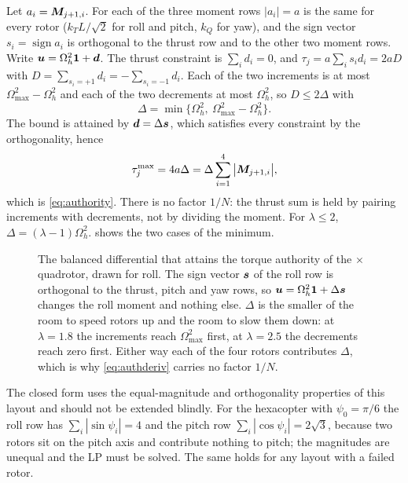 Let $a_i = \bm{M}_{j+1,i}$. For each of the three moment rows $|a_i|=a$ is the
same for every rotor ($k_TL/\sqrt2$ for roll and pitch, $k_Q$ for yaw), and the
sign vector $s_i=\operatorname{sign}a_i$ is orthogonal to the thrust row and to
the other two moment rows. Write $\bm{u} = \Omega_h^2\bm{1} + \bm{d}$. The
thrust constraint is $\sum_i d_i=0$, and $\tau_j = a\sum_i s_i d_i = 2aD$ with
$D=\sum_{s_i=+1}d_i=-\sum_{s_i=-1}d_i$. Each of the two increments is at most
$\Omega_{\max}^2-\Omega_h^2$ and each of the two decrements at most $\Omega_h^2$,
so $D\le2\Delta$ with
\begin{equation}
  \Delta = \min\{\Omega_h^2,\ \Omega_{\max}^2-\Omega_h^2\} .
\end{equation}
The bound is attained by $\bm{d}=\Delta\bm{s}$, which satisfies every
constraint by the orthogonality, hence
\begin{equation}
  \tau_j^{\max} = 4a\Delta = \Delta\sum_{i=1}^{4}\big|\bm{M}_{j+1,i}\big| ,
  \label{eq:authderiv}
\end{equation}
which is \cref{eq:authority}. There is no factor $1/N$: the thrust sum is held by
pairing increments with decrements, not by dividing the moment. For
$\lambda\le2$, $\Delta=(\lambda-1)\Omega_h^2$.  shows
the two cases of the minimum.

\begin{figure}[tbp]
\centering

\caption{The balanced differential that attains the torque authority of the
$\times$ quadrotor, drawn for roll. The sign vector $\bm{s}$ of the roll row
is orthogonal to the thrust, pitch and yaw rows, so
$\bm{u}=\Omega_h^2\bm{1}+\Delta\bm{s}$ changes the roll moment and nothing
else. $\Delta$ is the smaller of the room to speed rotors up and the room to
slow them down: at $\lambda=1.8$ the increments reach $\Omega_{\max}^2$ first,
at $\lambda=2.5$ the decrements reach zero first. Either way each of the four
rotors contributes $\Delta$, which is why \cref{eq:authderiv} carries no factor
$1/N$.}
\label{fig:differential}
\end{figure}

The closed form uses the equal-magnitude and orthogonality properties of this
layout and should not be extended blindly. For the hexacopter with
$\psi_0=\pi/6$ the roll row has $\sum_i|\sin\psi_i| = 4$ and the pitch row
$\sum_i|\cos\psi_i|=2\sqrt3$, because two rotors sit on the pitch axis and
contribute nothing to pitch; the magnitudes are unequal and the LP must be
solved. The same holds for any layout with a failed rotor.

